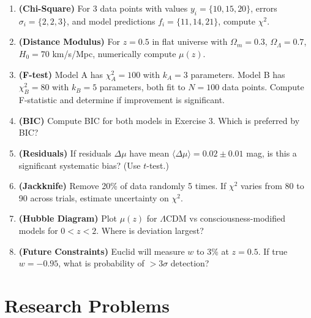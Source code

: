 \begin{enumerate}
\item \textbf{(Chi-Square)} For 3 data points with values $y_i = \{10, 15, 20\}$, errors $\sigma_i = \{2, 2, 3\}$, and model predictions $f_i = \{11, 14, 21\}$, compute $\chi^2$.

\item \textbf{(Distance Modulus)} For $z = 0.5$ in flat universe with $\Omega_m = 0.3$, $\Omega_\Lambda = 0.7$, $H_0 = 70$ km/s/Mpc, numerically compute $\mu(z)$.

\item \textbf{(F-test)} Model A has $\chi^2_A = 100$ with $k_A = 3$ parameters. Model B has $\chi^2_B = 80$ with $k_B = 5$ parameters, both fit to $N = 100$ data points. Compute F-statistic and determine if improvement is significant.

\item \textbf{(BIC)} Compute BIC for both models in Exercise 3. Which is preferred by BIC?

\item \textbf{(Residuals)} If residuals $\Delta \mu$ have mean $\langle \Delta \mu \rangle = 0.02 \pm 0.01$ mag, is this a significant systematic bias? (Use $t$-test.)

\item \textbf{(Jackknife)} Remove 20\% of data randomly 5 times. If $\chi^2$ varies from 80 to 90 across trials, estimate uncertainty on $\chi^2$.

\item \textbf{(Hubble Diagram)} Plot $\mu(z)$ for $\Lambda$CDM vs consciousness-modified models for $0 < z < 2$. Where is deviation largest?

\item \textbf{(Future Constraints)} Euclid will measure $w$ to 3\% at $z = 0.5$. If true $w = -0.95$, what is probability of $> 3\sigma$ detection?
\end{enumerate}

\section*{Research Problems}

